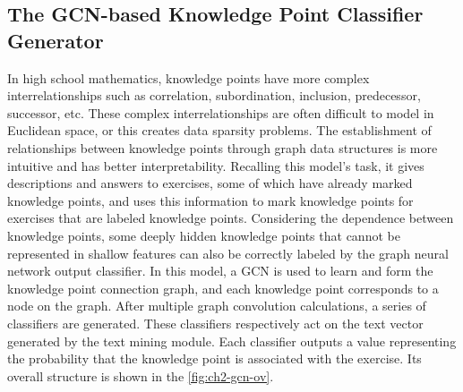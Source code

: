 \subsection{The GCN-based Knowledge Point Classifier Generator}


In high school mathematics, knowledge points have more complex interrelationships such as correlation, subordination, inclusion, predecessor, successor, etc. These complex interrelationships are often difficult to model in Euclidean space, or this creates data sparsity problems. The establishment of relationships between knowledge points through graph data structures is more intuitive and has better interpretability. Recalling this model's task, it gives descriptions and answers to exercises, some of which have already marked knowledge points, and uses this information to mark knowledge points for exercises that are labeled knowledge points. Considering the dependence between knowledge points, some deeply hidden knowledge points that cannot be represented in shallow features can also be correctly labeled by the graph neural network output classifier. In this model, a GCN is used to learn and form the knowledge point connection graph, and each knowledge point corresponds to a node on the graph. After multiple graph convolution calculations, a series of classifiers are generated. These classifiers respectively act on the text vector generated by the text mining module. Each classifier outputs a value representing the probability that the knowledge point is associated with the exercise. Its overall structure is shown in the \figurename{\ref{fig:ch2-gcn-ov}}.

